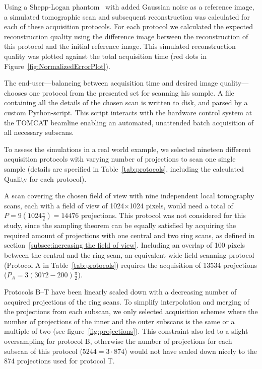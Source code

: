 Using a Shepp-Logan phantom~\cite{Shepp1974} with added Gaussian noise as a reference image, a simulated tomographic scan and subsequent reconstruction was calculated for each of these acquisition protocols. For each protocol we calculated the expected reconstruction quality using the difference image between the reconstruction of this protocol and the initial reference image. This simulated reconstruction quality was plotted against the total acquisition time (red dots in Figure~\ref{fig:NormalizedErrorPlot}).

The end-user---balancing between acquisition time and desired image quality---chooses one protocol from the presented set for scanning his sample. A file containing all the details of the chosen scan is written to disk, and parsed by a custom Python-script. This script interacts with the hardware control system at the TOMCAT beamline enabling an automated, unattended batch acquisition of all necessary subscans.

To assess the simulations in a real world example, we selected nineteen different acquisition protocols with varying number of projections to scan one single sample (details are specified in Table~\ref{tab:protocols}, including the calculated Quality for each protocol).

A scan covering the chosen field of view with nine independent local tomography scans, each with a field of view of 1024$\times$1024 pixels, would need a total of $P=9(1024\frac{\pi}{2})=14476$ projections. This protocol was not considered for this study, since the sampling theorem can be equally satisfied by acquiring the required amount of projections with one central and two ring scans, as defined in section~\ref{subsec:increasing the field of view}. Including an overlap of 100 pixels between the central and the ring scan, an equivalent wide field scanning protocol (Protocol A in Table~\ref{tab:protocols}) requires the acquisition of 13534 projections ($P_{A}=3(3072-200)\frac{\pi}{2}$).

Protocols B--T have been linearly scaled down with a decreasing number of acquired projections of the ring scans. To simplify interpolation and merging of the projections from each subscan, we only selected acquisition schemes where the number of projections of the inner and the outer subscans is the same or a multiple of two (see figure~\ref{fig:projections}). This constraint also led to a slight oversampling for protocol B, otherwise the number of projections for each subscan of this protocol ($5244=3\cdot874$) would not have scaled down nicely to the 874 projections used for protocol T.

